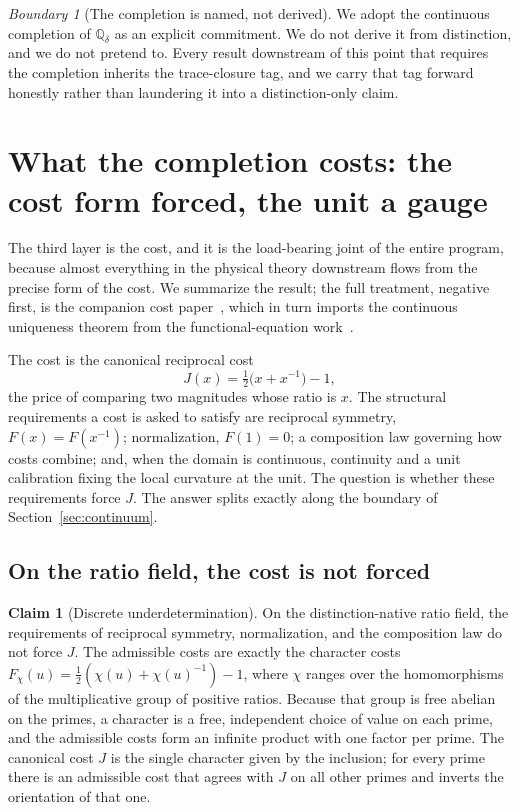 \documentclass[11pt,a4paper]{article}
\theoremstyle{definition}
\newtheorem{claim}[theorem]{Claim}
\theoremstyle{remark}
\newtheorem*{boundary}{Boundary}
\newcommand{\Qdelta}{\mathbb{Q}_{\delta}}
\begin{document}
\begin{boundary}[The completion is named, not derived]
We adopt the continuous completion of $\Qdelta$ as an explicit commitment. We do
not derive it from distinction, and we do not pretend to. Every result downstream
of this point that requires the completion inherits the trace-closure tag, and we
carry that tag forward honestly rather than laundering it into a distinction-only
claim.
\end{boundary}

\section{What the completion costs: the cost form forced, the unit a gauge}\label{sec:cost}

The third layer is the cost, and it is the load-bearing joint of the entire
program, because almost everything in the physical theory downstream flows from
the precise form of the cost. We summarize the result; the full treatment, negative
first, is the companion cost paper~\cite{DeltaCost}, which in turn imports the
continuous uniqueness theorem from the functional-equation
work~\cite{LogicFE,AxiomsCost}.

The cost is the canonical reciprocal cost
\[
  J(x) = \tfrac{1}{2}\bigl(x + x^{-1}\bigr) - 1,
\]
the price of comparing two magnitudes whose ratio is $x$. The structural
requirements a cost is asked to satisfy are reciprocal symmetry, $F(x) = F(x^{-1})$;
normalization, $F(1) = 0$; a composition law governing how costs combine; and,
when the domain is continuous, continuity and a unit calibration fixing the local
curvature at the unit. The question is whether these requirements force $J$. The
answer splits exactly along the boundary of Section~\ref{sec:continuum}.

\subsection{On the ratio field, the cost is not forced}

\begin{claim}[Discrete underdetermination]\label{cl:costneg}
On the distinction-native ratio field, the requirements of reciprocal symmetry,
normalization, and the composition law do not force $J$. The admissible costs are
exactly the character costs $F_\chi(u) = \tfrac{1}{2}(\chi(u) + \chi(u)^{-1}) - 1$,
where $\chi$ ranges over the homomorphisms of the multiplicative group of positive
ratios. Because that group is free abelian on the primes, a character is a free,
independent choice of value on each prime, and the admissible costs form an
infinite product with one factor per prime. The canonical cost $J$ is the single
character given by the inclusion; for every prime there is an admissible cost that
agrees with $J$ on all other primes and inverts the orientation of that one.
\end{claim}
\end{document}
